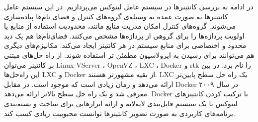       در ادامه به بررسی کانتینر‌ها در سیستم عامل لینوکس می‌پردازیم.
      در این سیستم عامل کانتینر‌ها به صورت عمده به وسیله‌ی گروه‌های کنترل\cite{tejun2015Linux} و فضای نام‌ها\cite{2015Linux} پیاده‌سازی می‌شوند.
      گروه‌های کنترل امکان مدریت منابع مانند، محدودیت استفاده از منابع یا اولویت پردازه‌ها را برای گروهی از پردازه‌ها مشخص می‌کنند.
      فضای‌نام‌ها هم یک دید محدود و اختصاصی برای منابع سیستم در هر کانتینر ایجاد می‌کند.
      مکانیزم‌های دیگری هم می‌توانند برای رسیدن به ایرولاسیون مطمئن تر استفاده شوند.
      از راه حل‌های مبتنی بر کانتینر می‌توان Linux-VServer \cite{2019vserver}، OpenVZ \cite{2019openvz}، LXC \cite{2019containers}، Docker \cite{2019docker} و rtk \cite{2019rtk} را نام برد.
      در بین این راه‌حل‌ها LXC و Docker از بقیه مشهورتر هستند.
      LXC یک راه حل سطح پایین‌تر ارائه می‌دهد و زمان زیادی است که موجود است.
      در مقابل Docker در سال ۲۰۰۹ معرفی شد و یک راه حل سطح بالاتر ارائه می‌دهد.
      Docker با ترکیب کردن کانتینر‌های لینوکس با یک سیستم فایل‌بندی لایه‌لایه و ارائه ابزار‌هایی برای ساخت و بسته‌بندی برنامه‌های کاربردی به صورت تصویر کانتینر‌ها توانست محبوبیت زیادی کسب کند.